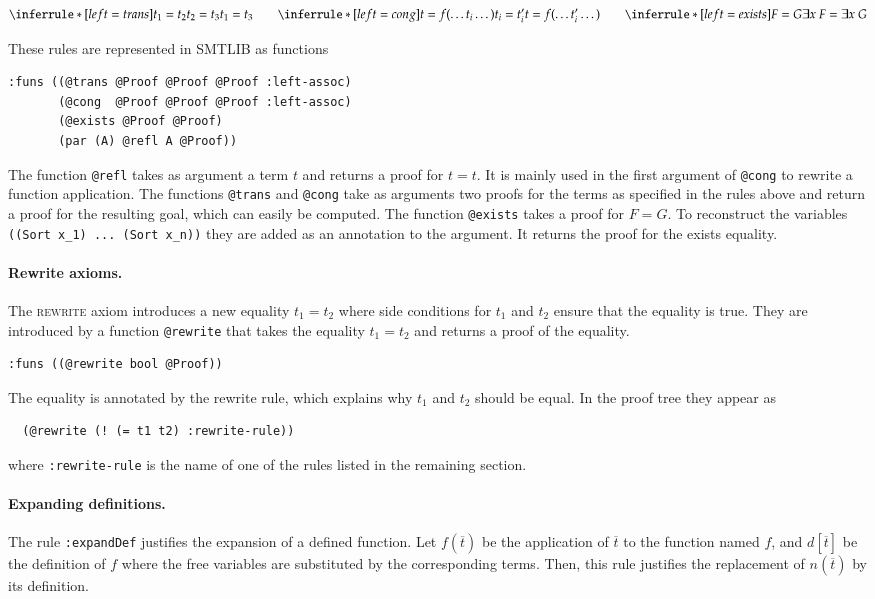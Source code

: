 \documentclass[a4paper]{article}
\begin{document}
\[
\inferrule*[left=trans]{t_1 = t_2 \\ t_2 = t_3}{t_1 = t_3}\qquad
\inferrule*[left=cong]{t = f(\dots t_i \dots) \\ t_i = t'_i}{t = f(\dots t'_i \dots)}\qquad
\inferrule*[left=exists]{F = G}{\exists x\ F = \exists x\ G}
\]

These rules are represented in SMTLIB as functions
\begin{verbatim}
:funs ((@trans @Proof @Proof @Proof :left-assoc)
       (@cong  @Proof @Proof @Proof :left-assoc)
       (@exists @Proof @Proof)
       (par (A) @refl A @Proof))
\end{verbatim}

The function \verb+@refl+ takes as argument a term $t$ and returns a
proof for $t=t$.  It is mainly used in the first argument of
\verb+@cong+ to rewrite a function application.  The functions
\verb+@trans+ and \verb+@cong+ take as arguments two proofs for the
terms as specified in the rules above and return a proof for the
resulting goal, which can easily be computed.  The function
\verb+@exists+ takes a proof for $F=G$.  To reconstruct the variables
\verb+((Sort x_1) ... (Sort x_n))+ they are added as an annotation to
the argument.  It returns the proof for the exists equality.

\paragraph{Rewrite axioms.}  The \textsc{rewrite} axiom introduces a
new equality $t_1=t_2$ where side conditions for $t_1$ and $t_2$
ensure that the equality is true.  They are introduced by a function
\verb+@rewrite+ that takes the equality $t_1=t_2$ and
returns a proof of the equality.

\begin{verbatim}
:funs ((@rewrite bool @Proof))
\end{verbatim}

The equality is annotated by the rewrite rule, which explains why
$t_1$ and $t_2$ should be equal. In the proof tree they appear as

\begin{verbatim}
  (@rewrite (! (= t1 t2) :rewrite-rule))
\end{verbatim}

where \texttt{:rewrite-rule} is the name of one of the rules listed in
the remaining section.


\paragraph{Expanding definitions.}  The rule \texttt{:expandDef} justifies
the expansion of a defined function.  Let $f(\overline{t})$ be the
application of $\overline{t}$ to the function named $f$, and
$d[\overline{t}]$ be the definition of $f$ where the free variables are
substituted by the corresponding terms.  Then, this rule justifies the
replacement of $n(\overline{t})$ by its definition.
\end{document}
